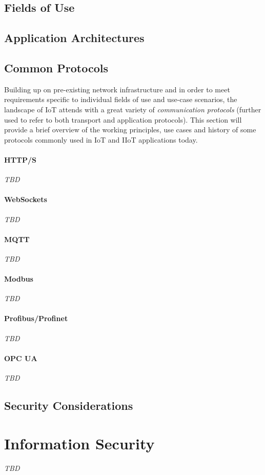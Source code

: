 \subsection{Fields of Use}
\subsection{Application Architectures}
\subsection{Common Protocols}
\label{sec:iot-common-protocols}
Building up on pre-existing network infrastructure and in order to meet requirements specific to individual fields of use and use-case scenarios, the landscape of \ac{IoT} attends with a great variety of \emph{communication protocols} (further used to refer to both transport and application protocols). This section will provide a brief overview of the working principles, use cases and history of some protocols commonly used in \ac{IoT} and \ac{IIoT} applications today.
\paragraph{HTTP/S} \emph{TBD} %
\paragraph{WebSockets} \emph{TBD} %
\paragraph{MQTT} \emph{TBD} %
\paragraph{Modbus} \emph{TBD} %
\paragraph{Profibus/Profinet} \emph{TBD} %
\paragraph{OPC UA} \emph{TBD} %

\subsection{Security Considerations}

\section{Information Security}
\label{sec:information-security}
\emph{TBD} %
